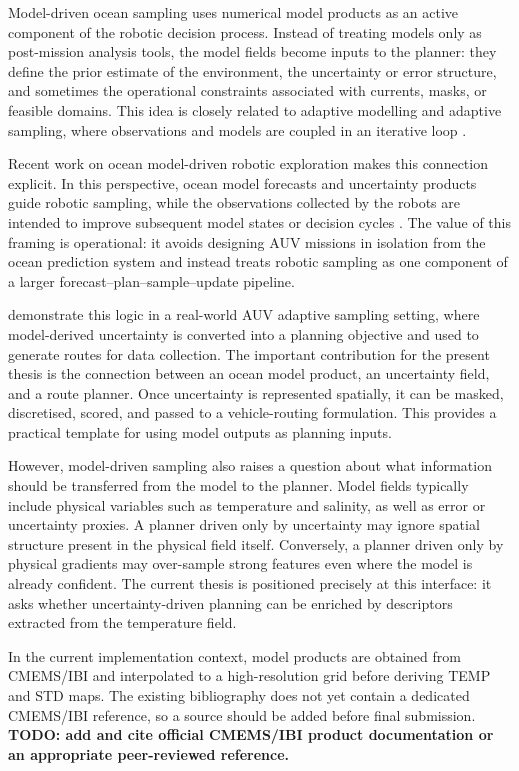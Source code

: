 Model-driven ocean sampling uses numerical model products as an active component of the robotic decision process. Instead of treating models only as post-mission analysis tools, the model fields become inputs to the planner: they define the prior estimate of the environment, the uncertainty or error structure, and sometimes the operational constraints associated with currents, masks, or feasible domains. This idea is closely related to adaptive modelling and adaptive sampling, where observations and models are coupled in an iterative loop \parencite{lermusiaux2007adaptive}.

Recent work on ocean model-driven robotic exploration makes this connection explicit. In this perspective, ocean model forecasts and uncertainty products guide robotic sampling, while the observations collected by the robots are intended to improve subsequent model states or decision cycles \parencite{mendes2025oceanmodeldriven}. The value of this framing is operational: it avoids designing AUV missions in isolation from the ocean prediction system and instead treats robotic sampling as one component of a larger forecast--plan--sample--update pipeline.

\textcite{bernacchi2025closingloop} demonstrate this logic in a real-world AUV adaptive sampling setting, where model-derived uncertainty is converted into a planning objective and used to generate routes for data collection. The important contribution for the present thesis is the connection between an ocean model product, an uncertainty field, and a route planner. Once uncertainty is represented spatially, it can be masked, discretised, scored, and passed to a vehicle-routing formulation. This provides a practical template for using model outputs as planning inputs.

However, model-driven sampling also raises a question about what information should be transferred from the model to the planner. Model fields typically include physical variables such as temperature and salinity, as well as error or uncertainty proxies. A planner driven only by uncertainty may ignore spatial structure present in the physical field itself. Conversely, a planner driven only by physical gradients may over-sample strong features even where the model is already confident. The current thesis is positioned precisely at this interface: it asks whether uncertainty-driven planning can be enriched by descriptors extracted from the temperature field.

In the current implementation context, model products are obtained from CMEMS/IBI and interpolated to a high-resolution grid before deriving TEMP and STD maps. The existing bibliography does not yet contain a dedicated CMEMS/IBI reference, so a source should be added before final submission. \textbf{TODO: add and cite official CMEMS/IBI product documentation or an appropriate peer-reviewed reference.}


